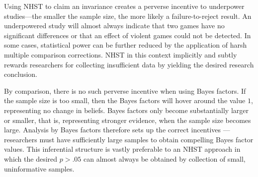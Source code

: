 \documentclass[man]{apa6}
\begin{document}

Using NHST to claim an invariance creates a perverse incentive to underpower studies---the smaller the sample size, the more likely a failure-to-reject result.  An underpowered study will almost always indicate that two games have no significant differences or that an effect of violent games could not be detected. In some cases, statistical power can be further reduced by the application of harsh multiple comparison corrections. NHST in this context implicitly and subtly rewards researchers for collecting insufficient data by yielding the desired research conclusion.

By comparison, there is no such perverse incentive when using Bayes factors. If the sample size is too small, then the Bayes factors will hover around the value $1$, representing no change in beliefs. Bayes factors only become substantially larger or smaller, that is, representing stronger evidence, when the sample size becomes large.  Analysis by Bayes factors therefore sets up the correct incentives --- researchers must have sufficiently large samples to obtain compelling Bayes factor values. This inferential structure is vastly preferable to an NHST approach in which the desired $p > .05$ can almost always be obtained by collection of small, uninformative samples.
\end{document}

